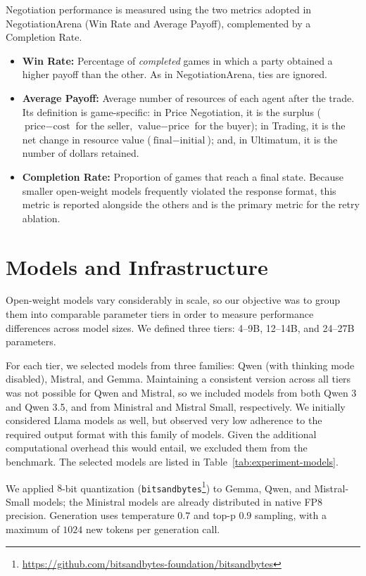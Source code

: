 Negotiation performance is measured using the two metrics adopted in NegotiationArena (Win Rate and Average Payoff), complemented by a Completion Rate.

\begin{itemize}
    \item \textbf{Win Rate:} Percentage of \textit{completed} games in which a party obtained a higher payoff than the other. As in NegotiationArena, ties are ignored.
    \item \textbf{Average Payoff:} Average number of resources of each agent after the trade. Its definition is game-specific: in Price Negotiation, it is the surplus ($\text{price} - \text{cost}$ for the seller, $\text{value} - \text{price}$ for the buyer); in Trading, it is the net change in resource value ($\text{final} - \text{initial}$); and, in Ultimatum, it is the number of dollars retained.
    \item \textbf{Completion Rate:} Proportion of games that reach a final state. Because smaller open-weight models frequently violated the response format, this metric is reported alongside the others and is the primary metric for the retry ablation.
\end{itemize}

\section{Models and Infrastructure} \label{sec:models-infra}

Open-weight models vary considerably in scale, so our objective was to group them into comparable parameter tiers in order to measure performance differences across model sizes. We defined three tiers: 4–9B, 12–14B, and 24–27B parameters. 

For each tier, we selected models from three families: Qwen (with thinking mode disabled), Mistral, and Gemma. Maintaining a consistent version across all tiers was not possible for Qwen and Mistral, so we included models from both Qwen 3 and Qwen 3.5, and from Ministral and Mistral Small, respectively. We initially considered Llama models as well, but observed very low adherence to the required output format with this family of models. Given the additional computational overhead this would entail, we excluded them from the benchmark. The selected models are listed in Table~\ref{tab:experiment-models}.

We applied $8$-bit quantization (\texttt{bitsandbytes}\footnote{\url{https://github.com/bitsandbytes-foundation/bitsandbytes}}) to Gemma, Qwen, and Mistral-Small models; the Ministral models are already distributed in native FP8 precision. Generation uses temperature $0.7$ and top-p $0.9$ sampling, with a maximum of $1024$ new tokens per generation call.

